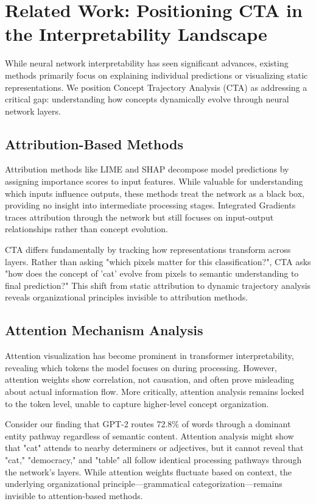 \section{Related Work: Positioning CTA in the Interpretability Landscape}

While neural network interpretability has seen significant advances, existing methods primarily focus on explaining individual predictions or visualizing static representations. We position Concept Trajectory Analysis (CTA) as addressing a critical gap: understanding how concepts dynamically evolve through neural network layers.

\subsection{Attribution-Based Methods}

Attribution methods like LIME \citep{ribeiro2016} and SHAP \citep{lundberg2017} decompose model predictions by assigning importance scores to input features. While valuable for understanding which inputs influence outputs, these methods treat the network as a black box, providing no insight into intermediate processing stages. Integrated Gradients \citep{sundararajan2017} traces attribution through the network but still focuses on input-output relationships rather than concept evolution.

CTA differs fundamentally by tracking how representations transform across layers. Rather than asking "which pixels matter for this classification?", CTA asks "how does the concept of 'cat' evolve from pixels to semantic understanding to final prediction?" This shift from static attribution to dynamic trajectory analysis reveals organizational principles invisible to attribution methods.

\subsection{Attention Mechanism Analysis}

Attention visualization has become prominent in transformer interpretability, revealing which tokens the model focuses on during processing. However, attention weights show correlation, not causation, and often prove misleading about actual information flow. More critically, attention analysis remains locked to the token level, unable to capture higher-level concept organization.

Consider our finding that GPT-2 routes 72.8\% of words through a dominant entity pathway regardless of semantic content. Attention analysis might show that "cat" attends to nearby determiners or adjectives, but it cannot reveal that "cat," "democracy," and "table" all follow identical processing pathways through the network's layers. While attention weights fluctuate based on context, the underlying organizational principle—grammatical categorization—remains invisible to attention-based methods.

